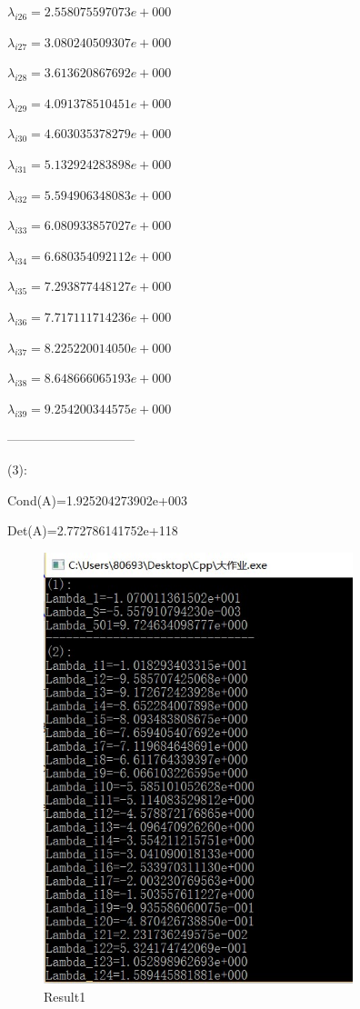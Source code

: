 $\lambda_{i26}=2.558075597073e+000$

$\lambda_{i27}=3.080240509307e+000$

$\lambda_{i28}=3.613620867692e+000$

$\lambda_{i29}=4.091378510451e+000$

$\lambda_{i30}=4.603035378279e+000$

$\lambda_{i31}=5.132924283898e+000$

$\lambda_{i32}=5.594906348083e+000$

$\lambda_{i33}=6.080933857027e+000$

$\lambda_{i34}=6.680354092112e+000$

$\lambda_{i35}=7.293877448127e+000$

$\lambda_{i36}=7.717111714236e+000$

$\lambda_{i37}=8.225220014050e+000$

$\lambda_{i38}=8.648666065193e+000$

$\lambda_{i39}=9.254200344575e+000$



------------------------------

(3):

Cond(A)=1.925204273902e+003

Det(A)=2.772786141752e+118


\begin{figure}[h]
\small
\centering
\includegraphics[width=9cm]{1.jpg}
\caption{Result1} \label{fig:1}
\end{figure}

